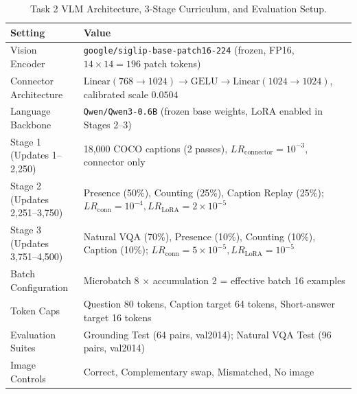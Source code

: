 \documentclass{article}
\begin{document}
\begin{table}[htbp]
    \centering
    \caption{Task 2 VLM Architecture, 3-Stage Curriculum, and Evaluation Setup.}
    \label{tab:app_t2_setup}
    \small
    \begin{tabular}{ll}
        \toprule
        Setting & Value \\
        \midrule
        Vision Encoder & \texttt{google/siglip-base-patch16-224} (frozen, FP16, $14\times 14 = 196$ patch tokens) \\
        Connector Architecture & $\text{Linear}(768\rightarrow 1024) \rightarrow \text{GELU} \rightarrow \text{Linear}(1024\rightarrow 1024)$, calibrated scale $0.0504$ \\
        Language Backbone & \texttt{Qwen/Qwen3-0.6B} (frozen base weights, LoRA enabled in Stages 2--3) \\
        Stage 1 (Updates 1--2,250) & 18,000 COCO captions (2 passes), $LR_{\text{connector}}=10^{-3}$, connector only \\
        Stage 2 (Updates 2,251--3,750) & Presence (50\%), Counting (25\%), Caption Replay (25\%); $LR_{\text{conn}}=10^{-4}, LR_{\text{LoRA}}=2\times 10^{-5}$ \\
        Stage 3 (Updates 3,751--4,500) & Natural VQA (70\%), Presence (10\%), Counting (10\%), Caption (10\%); $LR_{\text{conn}}=5\times 10^{-5}, LR_{\text{LoRA}}=10^{-5}$ \\
        Batch Configuration & Microbatch 8 $\times$ accumulation 2 = effective batch 16 examples \\
        Token Caps & Question 80 tokens, Caption target 64 tokens, Short-answer target 16 tokens \\
        Evaluation Suites & Grounding Test (64 pairs, val2014); Natural VQA Test (96 pairs, val2014) \\
        Image Controls & Correct, Complementary swap, Mismatched, No image \\
        \bottomrule
    \end{tabular}
\end{table}
\end{document}
